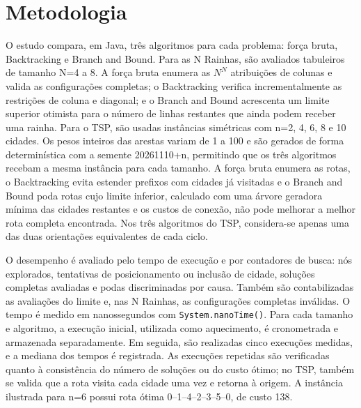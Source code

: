 \documentclass[12pt]{article}
\begin{document}


\section{Metodologia}

O estudo compara, em Java, três algoritmos para cada problema: força bruta, Backtracking e Branch and Bound. Para as N Rainhas, são avaliados tabuleiros de tamanho N=4 a 8. A força bruta enumera as $N^N$ atribuições de colunas e valida as configurações completas; o Backtracking verifica incrementalmente as restrições de coluna e diagonal; e o Branch and Bound acrescenta um limite superior otimista para o número de linhas restantes que ainda podem receber uma rainha. Para o TSP, são usadas instâncias simétricas com n=2, 4, 6, 8 e 10 cidades. Os pesos inteiros das arestas variam de 1 a 100 e são gerados de forma determinística com a semente 20261110+n, permitindo que os três algoritmos recebam a mesma instância para cada tamanho. A força bruta enumera as rotas, o Backtracking evita estender prefixos com cidades já visitadas e o Branch and Bound poda rotas cujo limite inferior, calculado com uma árvore geradora mínima das cidades restantes e os custos de conexão, não pode melhorar a melhor rota completa encontrada. Nos três algoritmos do TSP, considera-se apenas uma das duas orientações equivalentes de cada ciclo.

O desempenho é avaliado pelo tempo de execução e por contadores de busca: nós explorados, tentativas de posicionamento ou inclusão de cidade, soluções completas avaliadas e podas discriminadas por causa. Também são contabilizadas as avaliações do limite e, nas N Rainhas, as configurações completas inválidas. O tempo é medido em nanossegundos com \texttt{System.nanoTime()}. Para cada tamanho e algoritmo, a execução inicial, utilizada como aquecimento, é cronometrada e armazenada separadamente. Em seguida, são realizadas cinco execuções medidas, e a mediana dos tempos é registrada. As execuções repetidas são verificadas quanto à consistência do número de soluções ou do custo ótimo; no TSP, também se valida que a rota visita cada cidade uma vez e retorna à origem. A instância ilustrada para n=6 possui rota ótima 0--1--4--2--3--5--0, de custo 138.
\end{document}
